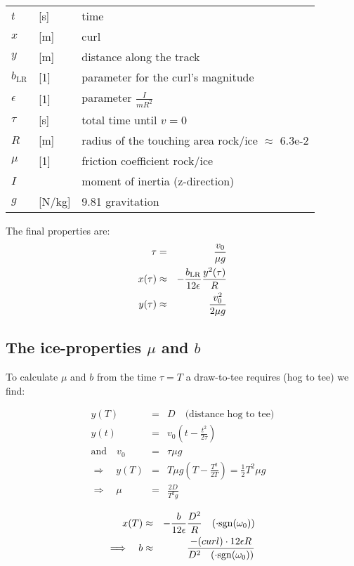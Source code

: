 \bigskip
\begin{tabular}{lll}
$t$		& [s] & time \\
$x$             & [m] & curl \\
$y$             & [m] & distance along the track \\
$b_\mathrm{LR}$ & [1] & parameter for the curl's magnitude \\
$\epsilon$	& [1] & parameter $ \frac{ I }{ mR^2 } $\\
$\tau$		& [s] & total time until $v=0$ \\
$R$		& [m] & radius of the touching area rock/ice $\approx$ 6.3e-2 \\
$\mu$		& [1] & friction coefficient rock/ice \\
$I$		&     & moment of inertia (z-direction) \\
$g$		& [N/kg] & 9.81 gravitation \\
\end{tabular}
\bigskip

The final properties are:
\begin{eqnarray}
\eqlab{denC} 
\tau    & = &     \frac{ v_0 }{ \mu g } \\
x(\tau) &\approx& - \frac{ b_\mathrm{LR} }{ 12\epsilon } \frac{y^2(\tau) }{R} \\
y(\tau) &\approx& \frac{ v_0^2 }{ 2\mu g }
\end{eqnarray}

\subsection{The ice-properties $\mu$ and $b$}

To calculate $\mu$ and $b$ from the time $\tau=T$ a draw-to-tee requires
(hog to tee) we find:

\begin{eqnarray}
y(T) &=& D \quad \mbox{(distance hog to tee)} \\
y(t) &=& v_0 \left(t-\frac{t^2}{2\tau}\right) \nonumber\\
\mbox{and} \quad v_0 &=& \tau \mu g \nonumber\\
\Rightarrow\quad y(T) &=& T \mu g \left(T - \frac{T^2}{2T} \right) =
\frac{1}{2} T^2 \mu g \\
\Longrightarrow\quad \mu &=& \frac{2D}{T^2 g}
\end{eqnarray}


\begin{eqnarray}
x(T) &\approx& - \frac{b}{12\epsilon} \frac{D^2}{R} \quad(\cdot  \mathrm{sgn} (\omega_0)) \nonumber\\
\Longrightarrow\quad
b &\approx& \frac{-(curl) \cdot 12\epsilon R}{ D^2 \quad (\cdot  \mathrm{sgn} (\omega_0)) }
\end{eqnarray}

